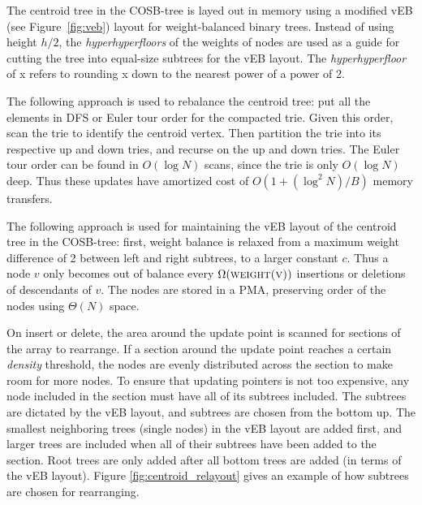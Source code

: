\documentclass[preprint]{style}
\begin{document}
The centroid tree in the COSB-tree is layed out in memory using a modified vEB
(see Figure~\ref{fig:veb}) layout for weight-balanced binary trees. Instead of using height $h/2$, the
\emph{hyperhyperfloors} of the weights of nodes are used as a guide for cutting the tree into
equal-size subtrees for the vEB layout. The \emph{hyperhyperfloor} of x refers
to rounding x down to the nearest power of a power of 2.


\vfill

The following approach is used to rebalance the centroid tree: put all the
elements in DFS or Euler tour order for the compacted trie. Given this order,
scan the trie to identify the centroid vertex. Then partition the trie into its
respective up and down tries, and recurse on the up and down tries. The Euler
tour order can be found in $O(\log{N})$ scans, since the trie is only
$O(\log{N})$ deep. Thus these updates have amortized cost of
$O(1+(\log^{2}{N})/B)$ memory transfers.

\vfill

The following approach is used for maintaining the vEB layout of the centroid
tree in the COSB-tree: first, weight balance is relaxed from a maximum weight
difference of 2 between left and right subtrees, to a larger constant $c$. Thus
a node $v$ only becomes out of balance every $\Omega(\textsc{weight(v)})$
insertions or deletions of descendants of $v$. The nodes are stored in a PMA,
preserving order of the nodes using $\Theta(N)$ space.

On insert or delete, the area around the update point is scanned for sections
of the array to rearrange. If a section around the update point reaches a
certain \textit{density} threshold, the nodes are evenly distributed across the
section to make room for more nodes. To ensure that updating pointers is not too
expensive, any node included in the section must have all of its subtrees
included. The subtrees are dictated by the vEB layout, and subtrees are chosen
from the bottom up. The smallest neighboring trees (single nodes) in the vEB
layout are added first, and larger trees are included when all of their
subtrees have been added to the section. Root trees are only added after all
bottom trees are added (in terms of the vEB layout). Figure
\ref{fig:centroid_relayout} gives an example of how subtrees are chosen for
rearranging.
\end{document}

